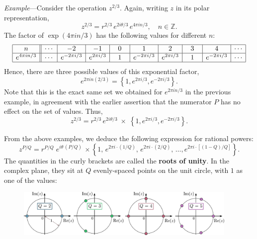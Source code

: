 \documentclass[10pt,a4paper]{article}
\begin{document}
\begin{framed} \noindent
  \textit{Example}---Consider the operation $z^{2/3}$. Again, writing
  $z$ in its polar representation,
\begin{equation}
z^{2/3} = r^{2/3} \, e^{2i\theta/3} \, e^{4\pi i n/3}, \quad n \in \mathbb{Z}.
\end{equation}
The factor of $\exp(4\pi i n/3)$ has the following values for
different $n$:
\begin{equation*}
\begin{array}{|c||c|c|c|c|c|c|c|c|c|} \hline n &\cdots & -2 & -1 & 0 & 1 & 2 & 3 & 4 & \cdots \\ \hline e^{4\pi i n/3} &\cdots & e^{-2\pi i /3} & e^{2\pi i /3} & \;\,\;1\;\,\; & e^{-2\pi i /3} & e^{2\pi i /3} & \;\,\;1\;\,\; & e^{-2\pi i /3} & \cdots \\ \hline \end{array}
\end{equation*}
Hence, there are three possible values of this exponential factor,
\begin{equation}
e^{2\pi i n (2/3)} = \left\{1, e^{2\pi i /3}, e^{-2\pi i /3}\right\}.
\end{equation}
Note that this is the exact same set we obtained for $e^{2\pi i n/3}$
in the previous example, in agreement with the earlier assertion that
the numerator $P$ has no effect on the set of values.  Thus,
\begin{equation}
z^{2/3} = r^{2/3} \, e^{2i\theta/3} \;\times\; \left\{1, e^{2\pi i /3}, e^{-2\pi i /3}\right\}.
\end{equation}
\end{framed}


From the above examples, we deduce the following expression for
rational powers:
\begin{equation}
z^{P/Q} = r^{P/Q} \; e^{i\theta\, (P/Q)}\, \times \left\{1,\, e^{2\pi i \cdot (1/Q)},\, e^{2\pi i \cdot (2/Q)},\, \dots, e^{2\pi i \cdot [(1-Q)/Q]} \right\}.
\end{equation}
The quantities in the curly brackets are called the \textbf{roots of
  unity}. In the complex plane, they sit at $Q$ evenly-spaced points
on the unit circle, with $1$ as one of the values:

\begin{figure}[ht]
  \centering\includegraphics[width=0.95\textwidth]{roots_of_unity}
\end{figure}
\end{document}
